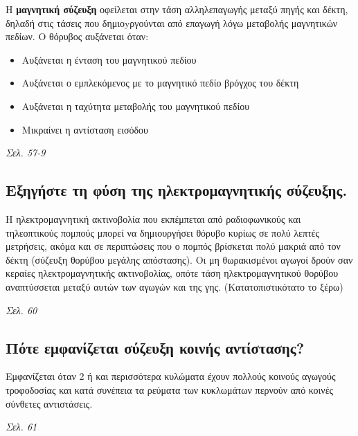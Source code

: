 \documentclass{article}
\begin{document}
Η \textbf{μαγνητική σύζευξη} οφείλεται στην τάση αλληλεπαγωγής μεταξύ πηγής και δέκτη, δηλαδή στις τάσεις που δημιοyργούνται από επαγωγή λόγω μεταβολής μαγνητικών πεδίων. Ο θόρυβος αυξάνεται όταν:
\begin{itemize}
    \item Aυξάνεται η ένταση του μαγνητικού πεδίου
    \item Αυξάνεται ο εμπλεκόμενος με το μαγνητικό πεδίο βρόγχος του δέκτη
    \item Αυξάνεται η ταχύτητα μεταβολής του μαγνητικού πεδίου
    \item Μικραίνει η αντίσταση εισόδου
\end{itemize}

\emph{Σελ. 57-9}

\subsection{Εξηγήστε τη φύση της ηλεκτρομαγνητικής σύζευξης.}
Η ηλεκτρομαγνητική ακτινοβολία που εκπέμπεται από ραδιοφωνικούς και τηλεοπτικούς πομπούς μπορεί να δημιουργήσει θόρυβο κυρίως σε πολύ λεπτές μετρήσεις, ακόμα και σε 
περιπτώσεις που ο πομπός βρίσκεται πολύ μακριά από τον δέκτη (σύζευξη θορύβου μεγάλης απόστασης). Οι μη θωρακισμένοι αγωγοί δρούν σαν κεραίες ηλεκτρομαγνητικής 
ακτινοβολίας, οπότε τάση ηλεκτρομαγνητικού θορύβου αναπτύσσεται μεταξύ αυτών των αγωγών και της γης. (Κατατοπιστικότατο το ξέρω)

\emph{Σελ. 60}

\subsection{Πότε εμφανίζεται σύζευξη κοινής αντίστασης?}
Εμφανίζεται όταν 2 ή και περισσότερα κυλώματα έχουν πολλούς κοινούς αγωγούς τροφοδοσίας και κατά συνέπεια τα ρεύματα των κυκλωμάτων περνούν από κοινές σύνθετες αντιστάσεις.

\emph{Σελ. 61}
\end{document}
